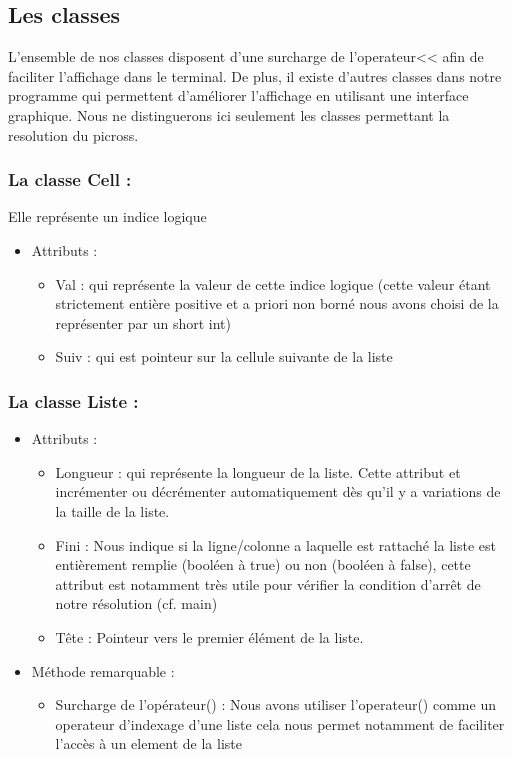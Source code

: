 \documentclass{article}
\begin{document}
\subsection{ Les classes}
L'ensemble de nos classes disposent d'une surcharge de l'operateur<< afin de faciliter l'affichage dans le terminal. De plus, il existe d'autres classes dans notre programme qui permettent d'améliorer l'affichage en utilisant une interface graphique. Nous ne distinguerons ici seulement les classes permettant la resolution du picross.

\subsubsection{La classe Cell :}
Elle représente un indice logique
\begin{itemize}
\item Attributs :
\begin{itemize}
\item Val : qui représente la valeur de cette indice logique (cette valeur étant strictement enti\`ere positive et a priori non borné nous avons choisi de la représenter par un short int)
\item Suiv : qui est pointeur sur la cellule suivante de la liste
\end{itemize}
\end{itemize}
\subsubsection{La classe Liste :}
\begin{itemize}
\item Attributs :
\begin{itemize}
\item Longueur : qui représente la longueur de la liste. Cette attribut et incrémenter ou décrémenter automatiquement d\`es qu'il y a variations de la taille de la
liste.
\item Fini : Nous indique si la ligne/colonne a laquelle est rattaché la liste est enti\`erement remplie (booléen à  true) ou non (booléen à  false), cette attribut est
notamment tr\`es utile pour vérifier la condition d'arrêt de notre résolution (cf. main)
\item Tête : Pointeur vers le premier élément de la liste.
\end{itemize}
\item Méthode remarquable :
\begin{itemize}
\item Surcharge de l'opérateur() : Nous avons utiliser l'operateur() comme un operateur d'indexage d'une liste cela nous permet notamment de faciliter l'acc\`es
à un element de la liste
\end{itemize}
\end{itemize}
\end{document}
